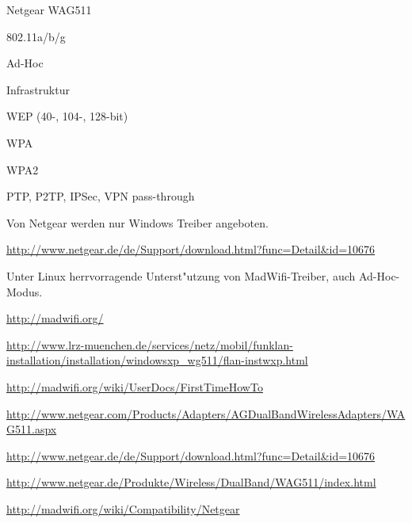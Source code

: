 %
%
\begin{wlandevice}{Netgear WAG511}



\begin{wlanieeestandard}
\item 802.11a/b/g
\end{wlanieeestandard}

\begin{wlanmode}
\item Ad-Hoc
\item Infrastruktur
\end{wlanmode}

\begin{wlansecurity}
\item WEP (40-, 104-, 128-bit)
\item WPA
\item WPA2
\item PTP, P2TP, IPSec, VPN pass-through
\end{wlansecurity}

\begin{wlandriver}
\item
Von Netgear werden nur Windows Treiber angeboten.

\url{http://www.netgear.de/de/Support/download.html?func=Detail&id=10676}

Unter Linux herrvorragende Unterst"utzung von MadWifi-Treiber,
auch Ad-Hoc-Modus.

\url{http://madwifi.org/}
\end{wlandriver}


\begin{wlaninstall}
\item
\url{http://www.lrz-muenchen.de/services/netz/mobil/funklan-installation/installation/windowsxp_wg511/flan-instwxp.html}

\url{http://madwifi.org/wiki/UserDocs/FirstTimeHowTo}
\end{wlaninstall}

\begin{wlanlink}
\item \url{http://www.netgear.com/Products/Adapters/AGDualBandWirelessAdapters/WAG511.aspx}
\item \url{http://www.netgear.de/de/Support/download.html?func=Detail&id=10676}
\item \url{http://www.netgear.de/Produkte/Wireless/DualBand/WAG511/index.html}
\item \url{http://madwifi.org/wiki/Compatibility/Netgear}
\end{wlanlink}

\end{wlandevice}

